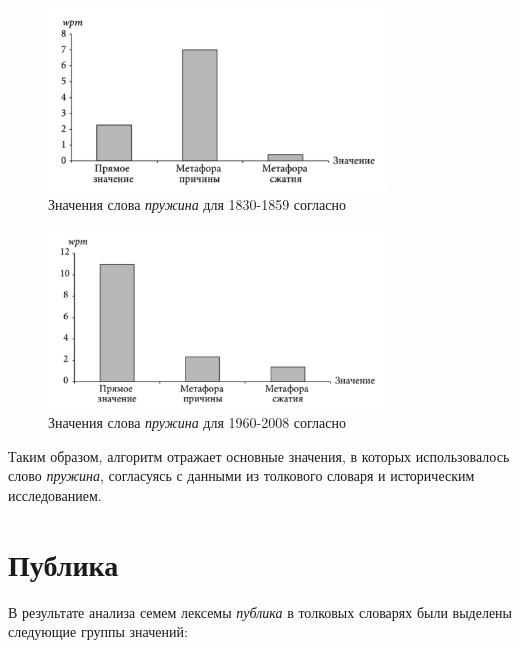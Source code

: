 \noindent %
\begin{figure}[H]
    \centering %
    \includegraphics[width=0.8\textwidth]{img/book/pruzhina/1830-1859}
    \caption{Значения слова \textit{пружина} для 1830-1859 согласно~\cite{TwoCenturies}}
\end{figure}

\begin{figure}[H]
    \centering %
    \includegraphics[width=0.8\textwidth]{img/book/pruzhina/1960-2008}
    \caption{Значения слова \textit{пружина} для 1960-2008 согласно~\cite{TwoCenturies}}
\end{figure}

Таким образом, алгоритм отражает основные значения, в которых использовалось
слово \textit{пружина}, согласуясь с данными из толкового словаря и историческим исследованием.

\section*{Публика}

В результате анализа семем лексемы \textit{публика} в толковых словарях были выделены следующие группы значений:

